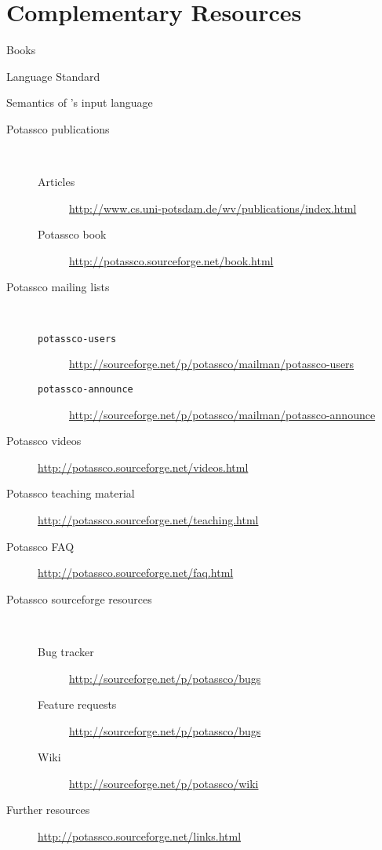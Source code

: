 
\section{Complementary Resources}
\label{sec:resources}

\begin{description}
\item [Books] \cite{baral03a,gekakasc12a,gelkah14a}
\item [Language Standard] \cite{aspcore2}
\item [Semantics of \gringo's input language] \cite{gehakalisc14a,haliya14a}
\item [Potassco publications] \
  \begin{description}
  \item [Articles]      \url{http://www.cs.uni-potsdam.de/wv/publications/index.html}
  \item [Potassco book] \url{http://potassco.sourceforge.net/book.html}
  \end{description}
\item [Potassco mailing lists] \
  \begin{description}
  \item [\texttt{potassco-users}]    \url{http://sourceforge.net/p/potassco/mailman/potassco-users}
  \item [\texttt{potassco-announce}] \url{http://sourceforge.net/p/potassco/mailman/potassco-announce}
  \end{description}
\item [Potassco videos]            \url{http://potassco.sourceforge.net/videos.html}
\item [Potassco teaching material] \url{http://potassco.sourceforge.net/teaching.html}
\item [Potassco FAQ]               \url{http://potassco.sourceforge.net/faq.html}
\item [Potassco sourceforge resources] \
  \begin{description}
  \item [Bug tracker]      \url{http://sourceforge.net/p/potassco/bugs}
  \item [Feature requests] \url{http://sourceforge.net/p/potassco/bugs}
  \item [Wiki]             \url{http://sourceforge.net/p/potassco/wiki}
  \end{description}
\item [Further resources] \url{http://potassco.sourceforge.net/links.html}
\end{description}

